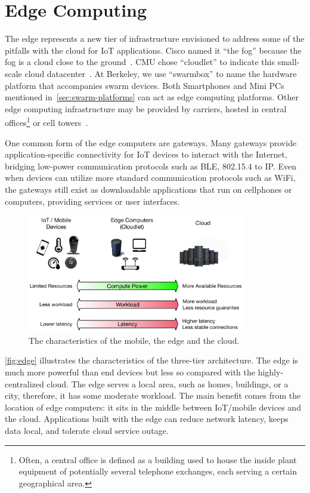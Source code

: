 \section{Edge Computing}
\label{sec:edge-computing}

The edge represents a new tier of infrastructure envisioned to address some of
the pitfalls with the cloud for IoT applications. Cisco named it ``the fog''
because the fog is a cloud close to the ground~\cite{bonomi2012fog}. CMU chose
``cloudlet'' to indicate this small-scale cloud datacenter~\cite{ha2014towards,
  satyanarayanan2009case}. At Berkeley, we use ``swarmbox'' to name the hardware
platform that accompanies swarm devices. Both Smartphones and Mini PCs mentioned
in~\autoref{sec:swarm-platforms} can act as edge computing platforms. Other edge
computing infrastructure may be provided by carriers, hosted in central
offices\footnote{Often, a central office is defined as a building used to house
  the inside plant equipment of potentially several telephone exchanges, each
  serving a certain geographical area.} or cell towers~\cite{att2017edge}.

One common form of the edge computers are gateways. Many gateways provide
application-specific connectivity for IoT devices to interact with the Internet,
bridging low-power communication protocols such as BLE, 802.15.4 to IP. Even
when devices can utilize more standard communication protocols such as WiFi, the
gateways still exist as downloadable applications that run on cellphones or
computers, providing services or user interfaces.

\begin{figure}
  \centering
  \includegraphics[width=0.85\textwidth]{figures/background.pdf}
  \caption{The characteristics of the mobile, the edge and the cloud.}
  \label{fig:edge}
\end{figure}

\autoref{fig:edge} illustrates the characteristics of the three-tier
architecture. The edge is much more powerful than end devices but less so
compared with the highly-centralized cloud. The edge serves a local area, such
as homes, buildings, or a city, therefore, it has some moderate workload. The
main benefit comes from the location of edge computers: it sits in the middle
between IoT/mobile devices and the cloud. Applications built with the edge can
reduce network latency, keeps data local, and tolerate cloud service outage.

